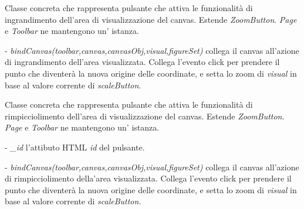 Classe concreta che rappresenta pulsante che attiva le funzionalit\` a di ingrandimento dell'area di visualizzazione del canvas.
Estende \textit{ZoomButton}.
\textit{Page} e \textit{Toolbar} ne mantengono un' istanza.
\begin{elencopuntato}[\subsubsecindent]
\item[-] \textit{bindCanvas(toolbar,canvas,canvasObj,visual,figureSet)} collega il canvas all'azione di ingrandimento dell'area visualizzata. Collega l'evento click per prendere il punto che diventer\`a la nuova origine delle coordinate, e setta lo zoom di \textit{visual} in base al valore corrente di \textit{scaleButton}.
\end{elencopuntato}

Classe concreta che rappresenta pulsante che attiva le funzionalit\` a di rimpicciolimento dell'area di visualizzazione del canvas.
Estende \textit{ZoomButton}.
\textit{Page} e \textit{Toolbar} ne mantengono un' istanza.
\begin{elencopuntato}[\subsubsecindent]
\item[-] \textit{{\_}id} l'attibuto HTML \textit{id} del pulsante.
\end{elencopuntato}
\begin{elencopuntato}[\subsubsecindent]
\item[-] \textit{bindCanvas(toolbar,canvas,canvasObj,visual,figureSet)} collega il canvas all'azione di rimpicciolimento della'area visualizzata. Collega l'evento click per prendere il punto che diventer\`a la nuova origine delle coordinate, e setta lo zoom di \textit{visual} in base al valore corrente di \textit{scaleButton}.
\end{elencopuntato}

